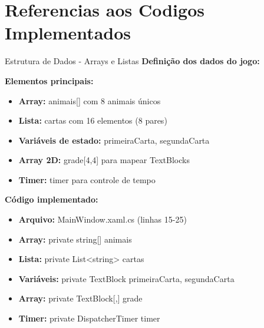 \documentclass[aspectratio=169]{beamer}
\begin{document}
\section{Referencias aos Codigos Implementados}

\begin{frame}{Estrutura de Dados - Arrays e Listas}
\textbf{Definição dos dados do jogo:}

\textbf{Elementos principais:}
\begin{itemize}
    \item \textbf{Array:} animais[] com 8 animais únicos
    \item \textbf{Lista:} cartas com 16 elementos (8 pares)
    \item \textbf{Variáveis de estado:} primeiraCarta, segundaCarta
    \item \textbf{Array 2D:} grade[4,4] para mapear TextBlocks
    \item \textbf{Timer:} timer para controle de tempo
\end{itemize}

\textbf{Código implementado:}
\begin{itemize}
    \item \textbf{Arquivo:} MainWindow.xaml.cs (linhas 15-25)
    \item \textbf{Array:} private string[] animais
    \item \textbf{Lista:} private List<string> cartas
    \item \textbf{Variáveis:} private TextBlock primeiraCarta, segundaCarta
    \item \textbf{Array:} private TextBlock[,] grade
    \item \textbf{Timer:} private DispatcherTimer timer
\end{itemize}
\end{frame}
\end{document}

